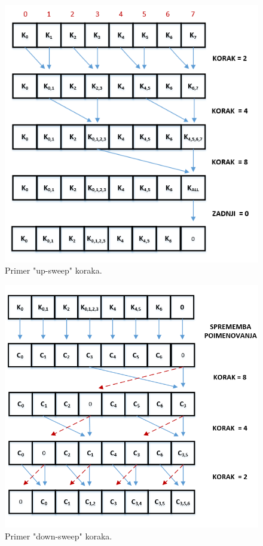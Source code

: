 \documentclass[a4paper,11pt]{article}
\begin{document}
\begin{figure}[htbp]
\begin{center}
\includegraphics[scale=0.74]{up-sweep.png}
\caption{Primer "up-sweep" koraka.}
\label{slika2}
\end{center}
\end{figure}

\begin{figure}[htbp]
\begin{center}
\includegraphics[scale=0.55]{down-sweep.png}
\caption{Primer "down-sweep" koraka.}
\label{slika3}
\end{center}
\end{figure}
\end{document}
